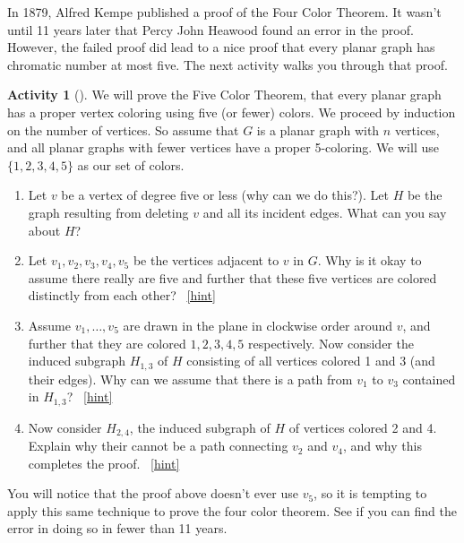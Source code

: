 \documentclass[10pt,]{book}
\theoremstyle{plain}
\theoremstyle{definition}
\theoremstyle{definition}
\theoremstyle{definition}
\newtheorem{activity}[project]{Activity}
\numberwithin{equation}{chapter}
\begin{document}
\hypertarget{p-1606}{}%
In 1879, Alfred Kempe published a proof of the Four Color Theorem.  It wasn't until 11 years later that Percy John Heawood found an error in the proof.  However, the failed proof did lead to a nice proof that every planar graph has chromatic number at most five.  The next activity walks you through that proof.%
\begin{activity}[]\label{activity-297}
\hypertarget{p-1607}{}%
We will prove the Five Color Theorem, that every planar graph has a proper vertex coloring using five (or fewer) colors.  We proceed by induction on the number of vertices.  So assume that \(G\) is a planar graph with \(n\) vertices, and all planar graphs with fewer vertices have a proper 5-coloring.  We will use \(\{1,2,3,4,5\}\) as our set of colors.%
\begin{enumerate}[font=\bfseries,label=(\alph*),ref=\alph*]
\item\label{task-271} \hypertarget{p-1608}{}%
Let \(v\) be a vertex of degree five or less (why can we do this?).  Let \(H\) be the graph resulting from deleting \(v\) and all its incident edges.  What can you say about \(H\)?%
\item\label{task-272} \hypertarget{p-1609}{}%
Let \(v_1, v_2, v_3, v_4, v_5\) be the vertices adjacent to \(v\) in \(G\).  Why is it okay to assume there really are five and further that these five vertices are colored distinctly from each other?%
~\hfill{\tiny\hyperlink{a-304.b}{[hint]}\hypertarget{q-304.b}{}}\item\label{task-273} \hypertarget{p-1611}{}%
Assume \(v_1, \ldots, v_5\) are drawn in the plane in clockwise order around \(v\), and further that they are colored \(1,2,3,4,5\) respectively.  Now consider the induced subgraph \(H_{1,3}\) of \(H\) consisting of all vertices colored 1 and 3 (and their edges).  Why can we assume that there is a path from \(v_1\) to \(v_3\) contained in \(H_{1,3}\)?%
~\hfill{\tiny\hyperlink{a-304.c}{[hint]}\hypertarget{q-304.c}{}}\item\label{task-274} \hypertarget{p-1613}{}%
Now consider \(H_{2,4}\), the induced subgraph of \(H\) of vertices colored 2 and 4.  Explain why their cannot be a path connecting \(v_2\) and \(v_4\), and why this completes the proof.%
~\hfill{\tiny\hyperlink{a-304.d}{[hint]}\hypertarget{q-304.d}{}}\end{enumerate}
\end{activity}
\hypertarget{p-1615}{}%
You will notice that the proof above doesn't ever use \(v_5\), so it is tempting to apply this same technique to prove the four color theorem.  See if you can find the error in doing so in fewer than 11 years.%
\typeout{************************************************}
\typeout{************************************************}
\end{document}

